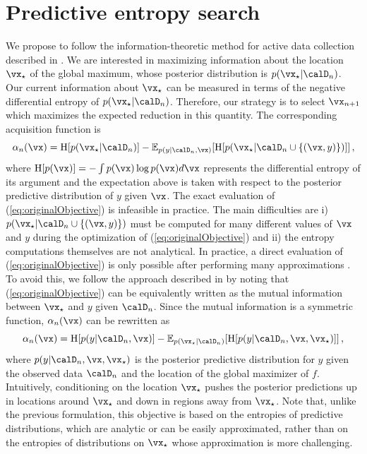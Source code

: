 \section{Predictive entropy search}
\label{sec:method}

We propose to follow the information-theoretic method for active
data collection described in \cite{MacKay:1992}. We are interested in maximizing
information about the location $\xopt$ of the global maximum, whose posterior distribution
is $p(\xopt|\D_n)$. Our current information about $\xopt$ can
be measured in terms of the negative differential entropy of $p(\xopt|\D_n)$.
Therefore, our strategy is to select $\x_{n+1}$ which maximizes the expected
reduction in this quantity. The corresponding acquisition function is
\begin{equation}
    \textstyle
    \alpha_n(\x)
    = 
    \H[p(\xopt |\D_n)] -
    \E_{p(y|\D_n,\x)} [
        \H[p(\xopt|\D_n\cup\{(\x,y)\})]
    ]
    \,,
    \label{eq:originalObjective}
\end{equation}
where $\H[p(\x)] = -\int p(\x) \log p(\x) d\x$ represents the differential
entropy of its argument and the expectation above is taken with respect to
the posterior predictive distribution of $y$ given $\x$. 
The exact evaluation of (\ref{eq:originalObjective}) is infeasible in practice. The
main difficulties are i) $p(\xopt|\D_n\cup\{(\x,y)\})$ must be computed for
many different values of $\x$ and $y$ during the optimization of (\ref{eq:originalObjective}) and ii) the
entropy computations themselves are not analytical.  In practice, a direct
evaluation of (\ref{eq:originalObjective}) is only possible after performing
many approximations \cite{HennigSchuler:2012}.  To avoid this, we follow
the approach described in \cite{Houlsby:2012} by noting that
(\ref{eq:originalObjective}) can be equivalently written as the mutual
information between $\xopt$ and $y$ given $\D_n$. Since the mutual
information is a symmetric function, $\alpha_n(\x)$ can be rewritten as
\begin{equation}
    \textstyle
    \alpha_n(\x)
    = 
    \H[p(y|\D_n,\x)] -
    \E_{p(\xopt|\D_n)} [
        \H[p(y|\D_n,\x,\xopt)]
    ]
    \,,
    \label{eq:newObjective}
\end{equation}
where $p(y|\D_n,\x,\xopt)$ is the posterior predictive distribution for $y$
given the observed data $\D_n$ and the location of the global maximizer of $f$.
Intuitively, conditioning on the location $\xopt$ pushes the posterior predictions up in
locations around $\xopt$ and down in regions away from $\xopt$.
Note that, unlike the previous formulation, this objective is based on the
entropies of predictive distributions, which are analytic or can be easily
approximated, rather than on the entropies of distributions on $\xopt$ whose
approximation is more challenging.

